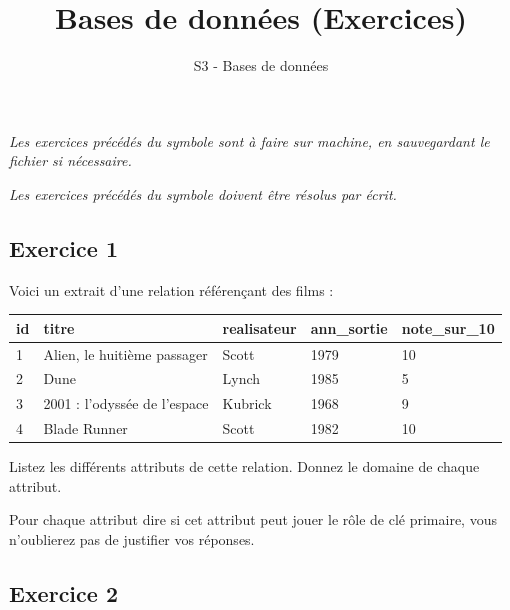 \documentclass[
  a4paper,
  DIV=11,
  numbers=noendperiod]{scrartcl}
\title{Bases de données (Exercices)}
\subtitle{S3 - Bases de données}
\author{}
\date{}
\begin{document}
\maketitle
{}  \chead{} \cfoot{}   \renewcommand{\headrulewidth}{0pt} \renewcommand{\footrulewidth}{0pt} \thispagestyle{fancy} \vspace{-3cm}

\ifdefined\Shaded\renewenvironment{Shaded}{\begin{tcolorbox}[interior hidden, sharp corners, boxrule=0pt, borderline west={3pt}{0pt}{shadecolor}, breakable, enhanced, frame hidden]}{\end{tcolorbox}}\fi

\emph{Les exercices précédés du symbole  sont à faire
sur machine, en sauvegardant le fichier si nécessaire.}

\emph{Les exercices précédés du symbole  doivent être
résolus par écrit.}

\hypertarget{fa-solid-pencil-alt-exercice-1}{%
\subsection{\texorpdfstring{ Exercice
1}{ Exercice 1}}\label{fa-solid-pencil-alt-exercice-1}}

Voici un extrait d'une relation référençant des films :

\begin{longtable}[]{@{}lllll@{}}
\toprule()
id & titre & realisateur & ann\_sortie & note\_sur\_10 \\
\midrule()
\endhead
1 & Alien, le huitième passager & Scott & 1979 & 10 \\
2 & Dune & Lynch & 1985 & 5 \\
3 & 2001 : l'odyssée de l'espace & Kubrick & 1968 & 9 \\
4 & Blade Runner & Scott & 1982 & 10 \\
\bottomrule()
\end{longtable}

Listez les différents attributs de cette relation. Donnez le domaine de
chaque attribut.

Pour chaque attribut dire si cet attribut peut jouer le rôle de clé
primaire, vous n'oublierez pas de justifier vos réponses.

\hypertarget{fa-solid-pencil-alt-exercice-2}{%
\subsection{\texorpdfstring{ Exercice
2}{ Exercice 2}}\label{fa-solid-pencil-alt-exercice-2}}
\end{document}
